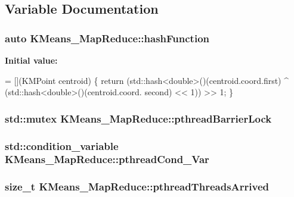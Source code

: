 \subsection{Variable Documentation}
\hypertarget{namespaceKMeans__MapReduce_adb399ee1c151b183ed1956ad1bfc2f18}{
\subsubsection[{hash\-Function}]{\setlength{\rightskip}{0pt plus 5cm}auto K\-Means\-\_\-\-Map\-Reduce\-::hash\-Function}}\label{namespaceKMeans__MapReduce_adb399ee1c151b183ed1956ad1bfc2f18}
{\bfseries Initial value\-:}
\begin{DoxyCode}
=
            [](KMPoint centroid) \{
                \textcolor{keywordflow}{return}  (std::hash<double>()(centroid.coord.first) ^ (std::hash<double>()(centroid.coord.
      second) << 1)) >> 1;
            \}
\end{DoxyCode}
\hypertarget{namespaceKMeans__MapReduce_abe48c6fe313eab1688c8243ef5c3a02b}{
\subsubsection[{pthread\-Barrier\-Lock}]{\setlength{\rightskip}{0pt plus 5cm}std\-::mutex K\-Means\-\_\-\-Map\-Reduce\-::pthread\-Barrier\-Lock}}\label{namespaceKMeans__MapReduce_abe48c6fe313eab1688c8243ef5c3a02b}
\hypertarget{namespaceKMeans__MapReduce_adc5383b10499ff2b0a302bb26c40f004}{
\subsubsection[{pthread\-Cond\-\_\-\-Var}]{\setlength{\rightskip}{0pt plus 5cm}std\-::condition\-\_\-variable K\-Means\-\_\-\-Map\-Reduce\-::pthread\-Cond\-\_\-\-Var}}\label{namespaceKMeans__MapReduce_adc5383b10499ff2b0a302bb26c40f004}
\hypertarget{namespaceKMeans__MapReduce_a3ebc17582a2928c65c8196cf5284ff79}{
\subsubsection[{pthread\-Threads\-Arrived}]{\setlength{\rightskip}{0pt plus 5cm}size\-\_\-t K\-Means\-\_\-\-Map\-Reduce\-::pthread\-Threads\-Arrived}}\label{namespaceKMeans__MapReduce_a3ebc17582a2928c65c8196cf5284ff79}
